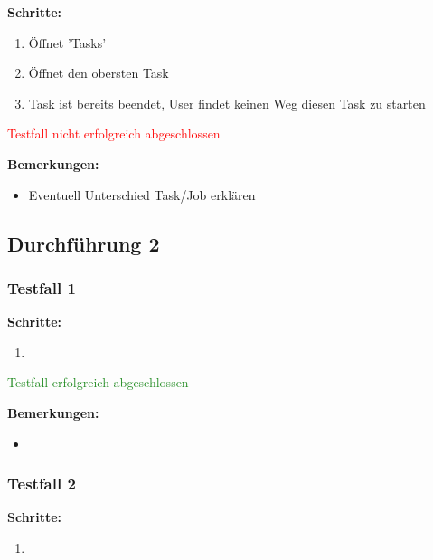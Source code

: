 \textbf{Schritte:}

\begin{enumerate}
    \item Öffnet 'Tasks'
    \item Öffnet den obersten Task
    \item Task ist bereits beendet, User findet keinen Weg diesen Task zu starten
\end{enumerate}

\textcolor{Red}{Testfall nicht erfolgreich abgeschlossen}

\bigskip
\textbf{Bemerkungen:}

\begin{itemize}[noitemsep,nolistsep]
    \item Eventuell Unterschied Task/Job erklären
\end{itemize}



\subsection*{Durchführung 2}

\xxx

\subsubsection*{Testfall 1}

\textbf{Schritte:}

\begin{enumerate}
    \item 
\end{enumerate}

\textcolor{ForestGreen}{Testfall erfolgreich abgeschlossen}

\bigskip
\textbf{Bemerkungen:}

\begin{itemize}[noitemsep,nolistsep]
    \item 
\end{itemize}


\subsubsection*{Testfall 2}

\textbf{Schritte:}

\begin{enumerate}
    \item 
\end{enumerate}

